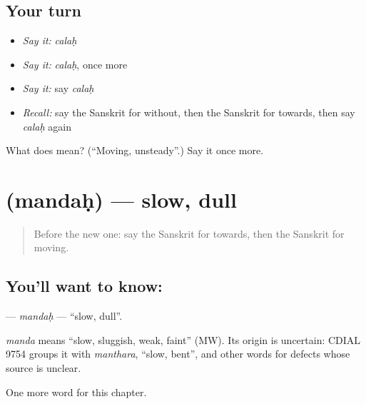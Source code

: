 \subsection*{Your turn}
\begin{itemize}
\raggedright
  \item \emph{Say it:} \emph{calaḥ}
  \item \emph{Say it:} \emph{calaḥ}, once more
  \item \emph{Say it:} say \emph{calaḥ}
  \item \emph{Recall:} say the Sanskrit for without, then the Sanskrit for towards, then say \emph{calaḥ} again
\end{itemize}

\begin{tcolorbox}[breakable,colback=teal!4,colframe=teal!35!black,title={Before you move on}]
What does  mean? (\textquotedblleft{}Moving, unsteady\textquotedblright{}.) Say it once more.
\end{tcolorbox}
\section[\texorpdfstring{\sk{मन्दः} (mandaḥ)}{मन्दः (mandaḥ)}]{ (mandaḥ) — slow, dull}

\label{lesson:SA-C215-mandah}



\begin{quote}
Before the new one: say the Sanskrit for towards, then the Sanskrit for moving.
\end{quote}

\subsection*{You'll want to know: }
\textbf{} — \emph{mandaḥ} — \textquotedblleft{}slow, dull\textquotedblright{}.

\begin{cousinweb}
\emph{manda} means \textquotedblleft{}slow, sluggish, weak, faint\textquotedblright{} (MW). Its origin is uncertain: CDIAL 9754 groups it with \emph{manthara}, \textquotedblleft{}slow, bent\textquotedblright{}, and other words for defects whose source is unclear.
\end{cousinweb}

\begin{grammarlens}[title={What you've built}]
One more word for this chapter.
\end{grammarlens}

